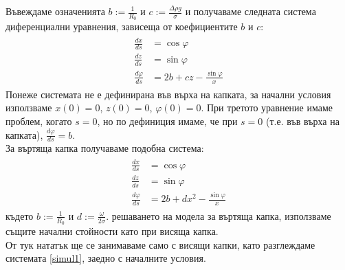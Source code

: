 \documentclass{article}
\begin{document}
Въвеждаме означенията
\large
\(b\!:=\frac{1}{R_0}\) \normalsize и \large \(c\!:=\frac{\Delta \rho g}{\sigma}\) 
\normalsize и получаваме следната система диференциални уравнения, зависеща от коефициентите \(b\) и \(c\):
\begin{align}
\begin{split} 
\frac {dx}{ds} &= \cos \varphi\label{simul1}\\
\frac {dz}{ds} &= \sin \varphi\\
\frac {d\varphi}{ds} &= 2b + cz - \frac{\sin \varphi}{x}
\end{split}
\end{align}
Понеже системата не е дефинирана във върха на капката, за начални условия използваме \(x(0)=0\), \(z(0)=0\), \(\varphi(0)=0\). При третото уравнение имаме проблем, когато \(s=0\), но по дефиниция имаме, че при \(s=0\) (т.е. във върха на капката), \large\begin{math}{\frac{d\varphi}{ds} = b}\end{math}\normalsize.\\
За въртяща капка получаваме подобна система:
\begin{align}
\begin{split}
\frac {dx}{ds} &= \cos \varphi\label{simul2}\\
\frac {dz}{ds} &= \sin \varphi\\
\frac {d\varphi}{ds} &= 2b + dx^2 - \frac{\sin \varphi}{x}
\end{split}
\end{align}
където 
\large
\(b\!:=\frac{1}{R_0}\) \normalsize и \large \(d\!:=\frac{\omega}{2\sigma}\). 
 решаването на модела за въртяща капка, използваме същите начални стойности като при висяща капка.\\
От тук нататък ще се занимаваме само с висящи капки, като разглеждаме системата \eqref{simul1}, заедно с началните условия.
\end{document}
